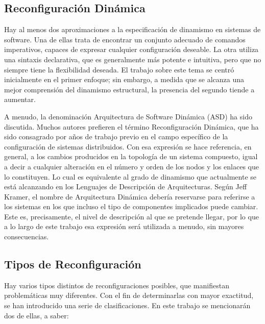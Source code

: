 \subsection{Reconfiguración Dinámica}

Hay al menos dos aproximaciones a la especificación de dinamismo en sistemas de
software. Una de ellas trata de encontrar un conjunto adecuado de comandos
imperativos, capaces de expresar cualquier configuración deseable. La otra
utiliza una sintaxis declarativa, que es generalmente más potente e intuitiva,
pero que no siempre tiene la flexibilidad deseada. El trabajo sobre este tema
se centró inicialmente en el primer enfoque; sin embargo, a medida que se
alcanza una mejor comprensión del dinamismo estructural, la presencia del
segundo tiende a aumentar.

A menudo, la denominación Arquitectura de Software Dinámica (ASD) ha sido
discutida. Muchos autores prefieren el término Reconfiguración Dinámica, que
ha sido consagrado por años de trabajo previo en el campo específico de la
configuración de sistemas distribuidos. Con esa expresión se hace referencia,
en general, a los cambios producidos en la topología de un sistema compuesto, igual a decir a cualquier alteración en el número y orden de los nodos y
los enlaces que lo constituyen. Lo cual es equivalente al grado de dinamismo que actualmente se
está alcanzando en los Lenguajes de Descripción de Arquitecturas. Según Jeff
Kramer, el nombre de Arquitectura Dinámica debería reservarse para referirse a
los sistemas en los que incluso el tipo de componentes implicados puede cambiar.
Este es, precisamente, el nivel de descripción al que se pretende llegar, por
lo que a lo largo de este trabajo esa expresión será utilizada a menudo, sin
mayores consecuencias.


\subsection{Tipos de Reconfiguración}

Hay varios tipos distintos de reconfiguraciones posibles, que manifiestan
problemáticas muy diferentes. Con el fin de determinarlas con mayor exactitud,
se han introducido una serie de clasificaciones. En este trabajo se mencionarán
dos de ellas, a saber:

